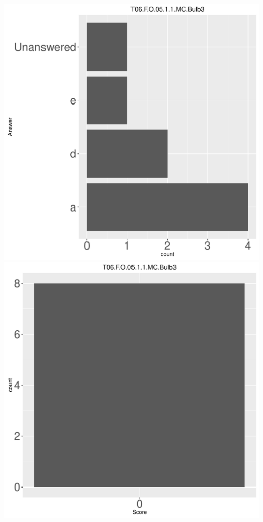 \documentclass[12pt,english,nohyper]{tufte-handout}\usepackage[]{graphicx}\usepackage[]{color}
\begin{document}
\begin{center} \includegraphics[width=.45\linewidth]{Topic06_AB_56_answer} \includegraphics[width=.45\linewidth]{Topic06_AB_56_score} \end{center} 
\end{document}

